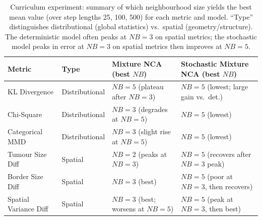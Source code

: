 \begin{table}[H]
\centering
\small
\begin{tabulary}{\textwidth}{lLLL}
\toprule
Metric & Type & Mixture NCA (best \(NB\)) & Stochastic Mixture NCA (best \(NB\)) \\
\midrule
KL Divergence & Distributional & \(NB=5\) (plateau after \(NB=3\)) & \(NB=5\) (lowest; large gain vs.\ det.) \\
Chi-Square & Distributional & \(NB=3\) (degrades at \(NB=5\)) & \(NB=5\) (lowest) \\
Categorical MMD & Distributional & \(NB=3\) (slight rise at \(NB=5\)) & \(NB=5\) (lowest) \\
\midrule
Tumour Size Diff & Spatial & \(NB=2\) (peaks at \(NB=3\)) & \(NB=5\) (recovers after \(NB=3\) peak) \\
Border Size Diff & Spatial & \(NB=3\) (best) & \(NB=5\) (poor at \(NB=3\), then recovers) \\
Spatial Variance Diff & Spatial & \(NB=3\) (best; worsens at \(NB=5\)) & \(NB=5\) (peak at \(NB=3\), then best) \\
\bottomrule
\end{tabulary}
\caption{Curriculum experiment: summary of which neighbourhood size yields the best mean value (over step lengths 25, 100, 500) for each metric and model. ``Type'' distinguishes distributional (global statistics) vs.\ spatial (geometry/structure). The deterministic model often peaks at \(NB=3\) on spatial metrics; the stochastic model peaks in error at \(NB=3\) on spatial metrics then improves at \(NB=5\).}
\label{tab:impl:curriculum:metrics_summary}
\end{table}
